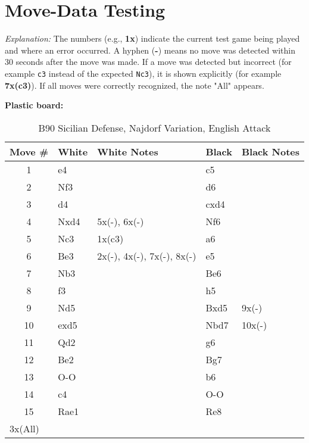 \chapter{Move-Data Testing}
\label{app:move-data-testing}


\par\scriptsize
\textit{Explanation:} The numbers (e.g., \textbf{1x}) indicate the current test game being played and where an error occurred. A hyphen (\textbf{-}) means no move was detected within 30 seconds after the move was made. If a move was detected but incorrect (for example \texttt{c3} instead of the expected \texttt{Nc3}), it is shown explicitly (for example \textbf{7x(c3)}). If all moves were correctly recognized, the note "All" appears.

\begin{center}
\textbf{Plastic board:}
\end{center}

\begin{table}[htbp]
\centering
\scriptsize
\caption{B90 Sicilian Defense, Najdorf Variation, English Attack}
\begin{tabular}{|c|l|p{5cm}|l|p{5cm}|}
\hline
\textbf{Move \#} & \textbf{White} & \textbf{White Notes} & \textbf{Black} & \textbf{Black Notes} \\
\hline
1  & e4    &                     & c5    &                        \\
2  & Nf3   &                     & d6    &                        \\
3  & d4    &                     & cxd4  &                        \\
4  & Nxd4  & 5x(-), 6x(-)        & Nf6   &                        \\
5  & Nc3   & 1x(c3)              & a6    &                        \\
6  & Be3   & 2x(-), 4x(-), 7x(-), 8x(-) & e5    &                        \\
7  & Nb3   &                     & Be6   &                        \\
8  & f3    &                     & h5    &                        \\
9  & Nd5   &                     & Bxd5  & 9x(-)                  \\
10 & exd5  &                     & Nbd7  & 10x(-)                 \\
11 & Qd2   &                     & g6    &                        \\
12 & Be2   &                     & Bg7   &                        \\
13 & O-O   &                     & b6    &                        \\
14 & c4    &                     & O-O   &                        \\
15 & Rae1  &                     & Re8   &                        \\
\hline
\multicolumn{5}{|l|}{3x(All)} \\
\hline
\end{tabular}
\end{table}

